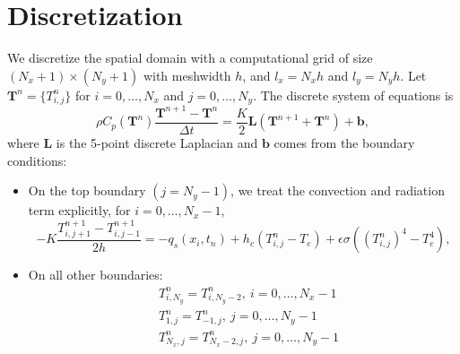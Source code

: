 \documentclass[a4paper,12pt]{article}
\newcommand{\V}[1]{\boldsymbol{#1}}
\newcommand{\B}[1]{\mathbf{#1}}
\begin{document}

\section{Discretization}
We discretize the spatial domain with a computational grid of size $(N_x +1) \times (N_y+1)$ with meshwidth $h$, and  $l_x = N_x h$ and $l_y = N_y h$. Let $\B{T}^n = \{T_{i,j}^n\}$ for $i=0,\dots,N_x$ and $j = 0, \dots, N_y$. The discrete system of equations is
\begin{equation}
 \rho C_p (\B{T}^n)  \frac{\B{T}^{n+1} -\B{T}^n }{\Delta t}= \frac{K}{2}  \V{L} ( \B{T}^{n+1} + \B{T}^{n}) + \B{b},
 \label{eq:macro_discrete}
\end{equation}
where $\V{L}$ is the 5-point discrete Laplacian and $\B{b}$ comes from the boundary conditions:
\begin{itemize}

\item On the top boundary $(j=N_y-1)$, we treat the convection and radiation term explicitly, for $i = 0,\dots, N_x-1$,
\begin{equation}
-K \frac{T_{i, j+1}^{n+1} - T_{i,j-1}^{n+1}}{2h} = -q_s (x_i, t_{n}) + h_c (T^{n}_{i,j} - T_e) + \epsilon \sigma ( (T^{n}_{i,j})^4 - T_e^4),
\end{equation}

\item On all other boundaries:
\begin{align}
& T_{i, N_y}^n =T_{i,N_y-2}^n, \ i = 0 , \dots , N_x - 1 \\
& T_{1, j}^n =T_{-1,j}^n, \ j = 0 , \dots , N_y-1 \\
& T_{N_x, j}^n =T_{N_x-2,j}^n, \ j = 0 , \dots , N_y-1
\end{align}
\end{itemize}
\end{document}
